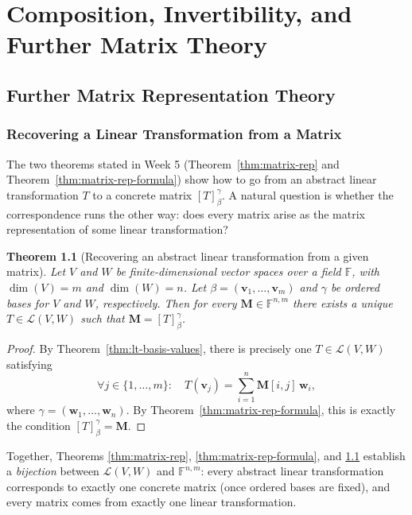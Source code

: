 \documentclass[11pt, a4paper, notitlepage]{report}
\newtheorem{theorem}{Theorem}[section]
\theoremstyle{definition}
\theoremstyle{remark}
\begin{document}
\chapter{Composition, Invertibility, and Further Matrix Theory}
\label{chap:week6}

\section{Further Matrix Representation Theory}
\label{sec:matrix-rep-week6}

\subsection{Recovering a Linear Transformation from a Matrix}

The two theorems stated in Week 5 (Theorem~\ref{thm:matrix-rep} and
Theorem~\ref{thm:matrix-rep-formula}) show how to go from an abstract linear transformation
$T$ to a concrete matrix $[T]_\beta^\gamma$.  A natural question is whether the correspondence
runs the other way: does every matrix arise as the matrix representation of some linear
transformation?

\begin{theorem}[Recovering an abstract linear transformation from a given matrix]
\label{thm:matrix-rep-recovery}
Let $V$ and $W$ be finite-dimensional vector spaces over a field $\mathbb{F}$, with
$\dim(V) = m$ and $\dim(W) = n$.  Let $\beta = (\mathbf{v}_1, \ldots, \mathbf{v}_m)$ and
$\gamma$ be ordered bases for $V$ and $W$, respectively.  Then for every
$\mathbf{M} \in \mathbb{F}^{n,m}$ there exists a \emph{unique} $T \in \mathcal{L}(V, W)$ such
that $\mathbf{M} = [T]_\beta^\gamma$.
\end{theorem}

\begin{proof}
By Theorem~\ref{thm:lt-basis-values}, there is precisely one $T \in \mathcal{L}(V,W)$
satisfying
\[
  \forall j \in \{1, \ldots, m\} : \quad
  T(\mathbf{v}_j) = \sum_{i=1}^{n} \mathbf{M}[i,j]\,\mathbf{w}_i,
\]
where $\gamma = (\mathbf{w}_1,\ldots,\mathbf{w}_n)$.  By
Theorem~\ref{thm:matrix-rep-formula}, this is exactly the condition $[T]_\beta^\gamma =
\mathbf{M}$.
\end{proof}

Together, Theorems \ref{thm:matrix-rep}, \ref{thm:matrix-rep-formula}, and
\ref{thm:matrix-rep-recovery} establish a \emph{bijection} between $\mathcal{L}(V,W)$ and
$\mathbb{F}^{n,m}$: every abstract linear transformation corresponds to exactly one concrete
matrix (once ordered bases are fixed), and every matrix comes from exactly one linear
transformation.
\end{document}
